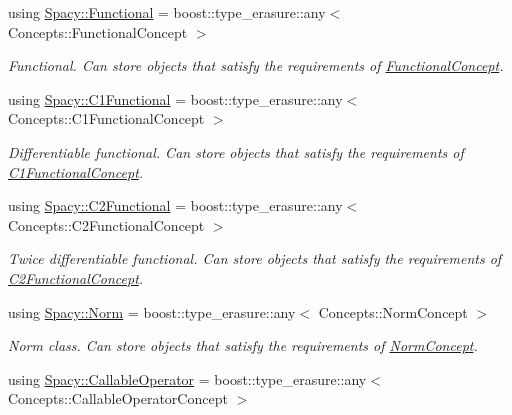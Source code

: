 \begin{DoxyCompactItemize}
using \hyperlink{group__SpacyGroup_ga673218f603c93790864aef12c89d3a35_ga673218f603c93790864aef12c89d3a35}{Spacy\+::\+Functional} = boost\+::type\+\_\+erasure\+::any$<$ Concepts\+::\+Functional\+Concept $>$
\begin{DoxyCompactList}\small\item\em Functional. Can store objects that satisfy the requirements of \hyperlink{group__ConceptGroup_ga5273b50bd3e8c9a3f5a1e6b5f170836d_FunctionalConceptAnchor}{Functional\+Concept}. \end{DoxyCompactList}\item 
using \hyperlink{group__SpacyGroup_gaa7cb8ef6c287b0af0352d3dd0eb9f200_gaa7cb8ef6c287b0af0352d3dd0eb9f200}{Spacy\+::\+C1\+Functional} = boost\+::type\+\_\+erasure\+::any$<$ Concepts\+::\+C1\+Functional\+Concept $>$
\begin{DoxyCompactList}\small\item\em Differentiable functional. Can store objects that satisfy the requirements of \hyperlink{group__ConceptGroup_ga205b55d8291e0f2e143f116cf78bc54f_C1FunctionalConceptAnchor}{C1\+Functional\+Concept}. \end{DoxyCompactList}\item 
using \hyperlink{group__SpacyGroup_gaf5b89e117806134b06a1ce4629fb2b65_gaf5b89e117806134b06a1ce4629fb2b65}{Spacy\+::\+C2\+Functional} = boost\+::type\+\_\+erasure\+::any$<$ Concepts\+::\+C2\+Functional\+Concept $>$
\begin{DoxyCompactList}\small\item\em Twice differentiable functional. Can store objects that satisfy the requirements of \hyperlink{group__ConceptGroup_gafb4414561b07b27100cad81ecf152e47_C2FunctionalConceptAnchor}{C2\+Functional\+Concept}. \end{DoxyCompactList}\item 
using \hyperlink{group__SpacyGroup_gaf4f33b11d657c48566d961a013c92bd1_gaf4f33b11d657c48566d961a013c92bd1}{Spacy\+::\+Norm} = boost\+::type\+\_\+erasure\+::any$<$ Concepts\+::\+Norm\+Concept $>$
\begin{DoxyCompactList}\small\item\em Norm class. Can store objects that satisfy the requirements of \hyperlink{group__ConceptGroup_ga8b6032c46f6e31840a2c956c6360549b_NormConceptAnchor}{Norm\+Concept}. \end{DoxyCompactList}\item 
using \hyperlink{group__SpacyGroup_ga2b74020d806ad800795cdd97dab3466f_ga2b74020d806ad800795cdd97dab3466f}{Spacy\+::\+Callable\+Operator} = boost\+::type\+\_\+erasure\+::any$<$ Concepts\+::\+Callable\+Operator\+Concept $>$

\end{DoxyCompactItemize}
